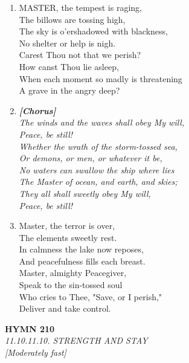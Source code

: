 \begin{enumerate}
    \item MASTER, the tempest is raging, \\
            The billows are tossing high, \\
        The sky is o'ershadowed with blackness, \\
            No shelter or help is nigh. \\
        Carest Thou not that we perish? \\
            How canst Thou lie asleep, \\
        When each moment so madly is threatening \\
            A grave in the angry deep?

    \item[] \vspace{0.4em}
    \textbf{\textit{[Chorus]}} \\
    \textit{The winds and the waves shall obey My will,} \\
    \textit{    Peace, be still!} \\
    \textit{Whether the wrath of the storm-tossed sea,} \\
    \textit{Or demons, or men, or whatever it be,} \\
    \textit{No waters can swallow the ship where lies} \\
    \textit{The Master of ocean, and earth, and skies;} \\
    \textit{They all shall sweetly obey My will,} \\
    \textit{    Peace, be still!}
    \vspace{0.4em}

    \item Master, the terror is over, \\
            The elements sweetly rest. \\
        In calmness the lake now reposes, \\
            And peacefulness fills each breast. \\
        Master, almighty Peacegiver, \\
            Speak to the sin-tossed soul \\
        Who cries to Thee, "Save, or I perish," \\
            Deliver and take control.

\end{enumerate}

\newpage
\begin{center}
    {\Large \textbf{HYMN 210}}
    \\
    \textit{11.10.11.10. STRENGTH AND STAY}
    \\
    \textit{\small [Moderately fast]}
\end{center}
\vspace{1em}

